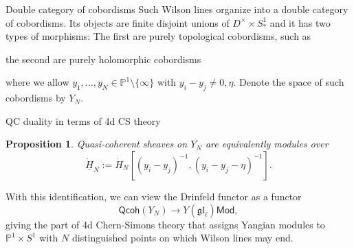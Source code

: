 \documentclass[11pt]{beamer}
\newtheorem{prop}[theorem]{Proposition}
\theoremstyle{remark}
\theoremstyle{remark}
\newcommand{\C}{\mathbb{C}}
\renewcommand{\P}{\mathbb{P}}
\begin{document}
\begin{frame}[fragile]{Double category of cobordisms}
Such Wilson lines organize into a double category of cobordisms. Its objects are finite disjoint unions of $D^\times \times S_*^1$ and it has two types of morphisms: The first are purely topological cobordisms, such as
\begin{center}
\end{center}
the second are purely holomorphic cobordisms
\begin{center}
\end{center}
where we allow $y_1,...,y_N \in \P^1 \setminus \{ \infty \}$ with $y_i-y_j \neq 0,\eta$. Denote the space of such cobordisms by $Y_N$.
\end{frame}

\begin{frame}{QC duality in terms of 4d CS theory}
\begin{prop}
Quasi-coherent sheaves on $Y_N$ are equivalently modules over
\begin{equation*}
\underline{\dot H}_N := \dot H_N[(y_i-y_j)^{-1},(y_i-y_j-\eta)^{-1}].
\end{equation*}
\end{prop}
With this identification, we can view the Drinfeld functor as a functor
\begin{equation*}
\mathsf{Qcoh}(Y_N) \to Y(\mathfrak{gl}_\ell)\mathsf{Mod},
\end{equation*}
giving the part of 4d Chern-Simons theory that assigns Yangian modules to $\P^1 \times S^1$ with $N$ distinguished points on which Wilson lines may end.
\end{frame}
\end{document}

